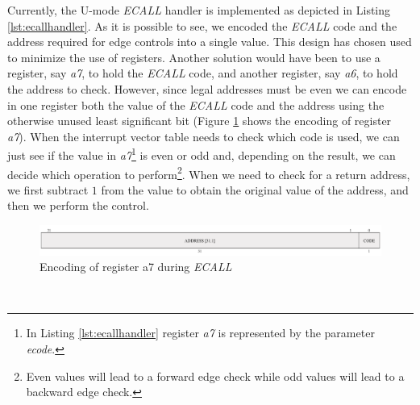 Currently, the U-mode \textit{ECALL} handler is implemented as depicted in
Listing \ref{lst:ecallhandler}. As it is possible to see, we encoded the \textit{ECALL}
code and the address required for edge controls into a single value. This design
has chosen used to minimize the use of registers. Another solution would have been
to use a register, say \textit{a7}, to hold the \textit{ECALL} code, and another
register, say \textit{a6}, to hold the address to check. However, since legal addresses
must be even we can encode in one register both the value of the \textit{ECALL}
code and the address using the otherwise unused least significant bit (Figure \ref{fig:ecall}
shows the encoding of register \textit{a7}). When the interrupt vector table
needs to check which code is used, we can just see if the value in \textit{a7}\footnote{In
Listing \ref{lst:ecallhandler} register \textit{a7} is represented by the parameter
\textit{ecode}.} is even or odd and, depending on the result, we can decide which
operation to perform\footnote{Even values will lead to a forward edge check
while odd values will lead to a backward edge check.}. When we need to check for
a return address, we first subtract $1$ from the value to obtain the original
value of the address, and then we perform the control. \\
\begin{figure}[htbp]
  \centering
  \includegraphics[width=.9\linewidth]{images/ecall_code.png}
  \caption{Encoding of register a7 during \textit{ECALL}}
  \label{fig:ecall}
\end{figure}
\\

